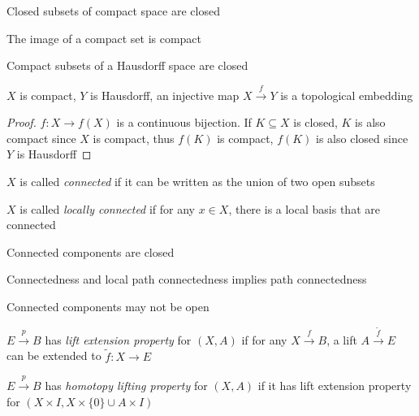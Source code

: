 \documentclass[main]{subfiles}
\begin{document}
\begin{lemma}
Closed subsets of compact space are closed \par
The image of a compact set is compact \par
Compact subsets of a Hausdorff space are closed
\end{lemma}

\begin{lemma}\label{X compact, Y Hausdorff, injective maps are embeddings}
$X$ is compact, $Y$ is Hausdorff, an injective map $X\xrightarrow fY$ is a topological embedding
\end{lemma}

\begin{proof}
$f:X\to f(X)$ is a continuous bijection. If $K\subseteq X$ is closed, $K$ is also compact since $X$ is compact, thus $f(K)$ is compact, $f(K)$ is also closed since $Y$ is Hausdorff
\end{proof}

\begin{definition}
$X$ is called \textit{connected} if it can be written as the union of two open subsets \par
$X$ is called \textit{locally connected} if for any $x\in X$, there is a local basis that are connected
\end{definition}

\begin{proposition}
Connected components are closed \par
Connectedness and local path connectedness implies path connectedness
\end{proposition}

\begin{remark}
Connected components may not be open
\end{remark}

\begin{definition}
$E\xrightarrow{p} B$ has \textit{lift extension property} for $(X,A)$ if for any $X\xrightarrow{f} B$, a lift $A\xrightarrow{\tilde f} E$ can be extended to $\tilde f:X\to E$
\begin{center}
\end{center}
$E\xrightarrow{p} B$ has \textit{homotopy lifting property} for $(X,A)$ if it has lift extension property for $(X\times I,X\times\{0\}\cup A\times I)$
\end{definition}
\end{document}
